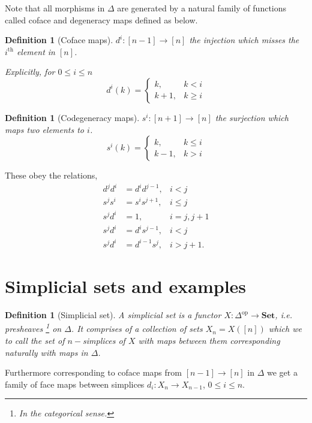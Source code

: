 \documentclass[12pt]{report}
\numberwithin{equation}{section}
\newtheorem{definition}[dummy]{Definition}
\begin{document}
	Note that all morphisms in $\Delta$ are generated by a natural family of functions called coface and degeneracy maps defined as below.
	\begin{definition}[Coface maps]
		$d^i:[n-1] \to [n]$ the injection which misses the $i^\mathrm{th}$ element in $[n]$.
		
		Explicitly, for $0 \leq i \leq n$
		\[
		d^i(k) =
		\begin{cases}
			k, & k < i \\
			k + 1, & k \geq i
		\end{cases}
		\]
	\end{definition}
	\begin{definition}[Codegeneracy maps]
		$s^i:[n+1]\to[n]$ the surjection which maps two elements to $i$.
		\[
		s^i(k) =
		\begin{cases}
			k, & k \leq i \\
			k - 1, & k > i
		\end{cases}
		\]
	\end{definition}
	
	These obey the relations,
	\begin{align*}
		d^j d^i &= d^i d^{j-1}, & i < j \\
		s^j s^i &= s^i s^{j+1}, & i \leq j \\
		s^j d^i &= 1, & i = j, j+1 \\
		s^j d^i &= d^i s^{j-1}, & i < j \\
		s^j d^i &= d^{i-1} s^j, & i > j+1.
	\end{align*}
	
	
	
	\section{Simplicial sets and examples}
	
	\begin{definition}[Simplicial set]
		A simplicial set is a functor $X: \Delta^\mathrm{op} \to \mathbf{Set}$, i.e. presheaves \footnote{In the categorical sense.} on $\Delta$. It comprises of a collection of sets $X_n =X([n])$ which we to call the set of $n-$simplices of $X$ with maps between them corresponding naturally with maps in $\Delta$.
	\end{definition}
	
	 
	
	Furthermore corresponding to coface maps from $[n-1] \to [n]$ in $\Delta$ we get a family of face maps between simplices $d_i:X_n \to X_{n-1}$, $0\leq i \leq n$.
	
\end{document}
